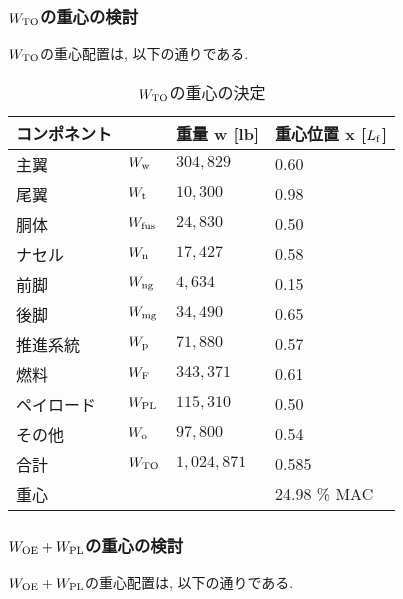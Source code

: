 \documentclass[12pt]{jsarticle}
\begin{document}
\subsubsection{$W_{\rm TO}$の重心の検討}
$W_{\rm TO}$の重心配置は, 以下の通りである.
\begin{table}[H]
	\caption{$W_{\rm TO}$の重心の決定}
	\begin{center}
		\begin{tabular}{p{2cm} p{2cm} p{3cm} p{3cm}} \hline
			コンポネント  & & 重量 w [lb] & 重心位置 x [$L_{\rm f}$] \\ \hline \hline
			主翼 & $W_{\rm w}$ & $304,829$ & 0.60 \\
			尾翼 & $W_{\rm t}$ & $10,300$ & 0.98 \\
			胴体 & $W_{\rm fus}$ & $24,830$ & 0.50 \\
			ナセル & $W_{\rm n}$ & $17,427$ & 0.58 \\
			前脚 & $W_{\rm ng}$ & $4,634$ & 0.15 \\
			後脚 & $W_{\rm mg}$ & $34,490$ & 0.65 \\
			推進系統 & $W_{\rm p}$ & $71,880$ & 0.57 \\
			燃料 & $W_{\rm F}$ & $343,371$ & 0.61 \\
			ペイロード & $W_{\rm PL}$ & $115,310$ & 0.50 \\
			その他 & $W_{\rm o}$ & $97,800$ & 0.54 \\ \hline
			合計 & $W_{\rm TO}$ & $1,024,871$ & 0.585 \\ \hline \hline
			重心 & & & 24.98 \% MAC \\ \hline
		\end{tabular}
	\end{center}
\end{table}

\subsubsection{$W_{\rm OE} + W_{\rm PL}$の重心の検討}
$W_{\rm OE} + W_{\rm PL}$の重心配置は, 以下の通りである.
\end{document}
